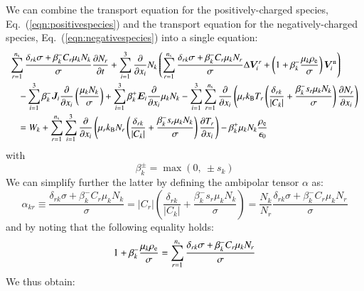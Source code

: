 \documentclass[twoside,onecolumn,10pt]{waflarticle}
\renewcommand{\vec}[1]{\bm{#1}}
\newcommand{\alb}{\vspace{0.1cm}\\} %
\newcommand{\mfd}{\displaystyle}
\newcommand{\ns}{{n_{\rm s}}}
\renewcommand{\vec}[1]{\bm{ #1 }}
\begin{document}
We can combine the transport equation for the positively-charged species, Eq.\ (\ref{eqn:positivespecies}) and the transport equation for the negatively-charged species, Eq.\ (\ref{eqn:negativespecies}) into a single equation:
%
\begin{equation}
\begin{array}{l}\mfd
  \sum_{r=1}^{\ns} \frac{\delta_{rk}\sigma + \beta^-_k C_r  \mu_k N_k}{\sigma} \frac{\partial N_r}{\partial t}  
+ \sum_{i=1}^3 \frac{\partial}{\partial x_i}   N_k \left(\sum_{r=1}^\ns \frac{\delta_{rk}\sigma+\beta_k^- C_r  \mu_k N_r}{\sigma} \Delta \vec{V}_i^r + \left(1+\beta_k^- \frac{\mu_k\rho_{\rm e}}{\sigma}\right)\vec{V}^{\rm n}_i\right) 
\alb\mfd~~~~
-  \sum_{i=1}^3 \beta_k^- \vec{J}_i \frac{\partial}{\partial x_i}  \left( \frac{\mu_k N_k}{\sigma} 
\right) 
+ \sum_{i=1}^3 \beta_k^+ \vec{E}_i \frac{\partial }{\partial x_i} \mu_{k} N_{k}
- \sum_{i=1}^3 \sum_{r=1}^{\ns} \frac{\partial}{\partial x_i} \left(\mu_r k_{\rm B} T_r\left(\frac{ \delta_{rk} }{ |C_k|}+   \frac{\beta_k^- s_r \mu_k N_k }{\sigma}\right)  \frac{\partial N_r}{\partial x_i}\right) 
\alb\mfd~~~~
= W_k
+ \sum_{r=1}^\ns \sum_{i=1}^3  \frac{\partial}{\partial x_i} \left( \mu_r k_{\rm B} N_r   \left(\frac{\delta_{rk}}{|C_k|}+\frac{\beta_k^- s_r \mu_k N_k}{\sigma}\right)  \frac{\partial T_r}{\partial x_i} \right)
-\beta_k^+ \mu_{k} N_{k}\frac{\rho_{\rm e}}{\epsilon_0}  
\end{array}
\end{equation}
%
with
%
\begin{equation}
\beta_k^\pm = \max(0,~\pm s_k)
\end{equation}
%
We can simplify further the latter by defining the ambipolar tensor $\alpha$ as:
%
\begin{equation}
\alpha_{kr} \equiv
  \frac{\delta_{rk}\sigma+ \beta_k^- C_r  \mu_k N_k}{\sigma} 
=  |C_r| \left( \frac{\delta_{rk}}{|C_k|}+  \frac{ \beta_k^- s_r \mu_k N_k}{\sigma}\right)
=  \frac{N_k}{N_r}\frac{\delta_{rk}\sigma+ \beta_k^- C_r  \mu_k N_r}{\sigma} 
\end{equation}
%
and by noting that the following equality holds:
%
\begin{equation}
1+\beta_k^- \frac{\mu_k\rho_{\rm e}}{\sigma} 
= \sum_{r=1}^\ns \frac{\delta_{rk}\sigma+ \beta_k^- C_r  \mu_k N_r}{\sigma} 
 \end{equation}
%
We thus obtain:
%
\end{document}

